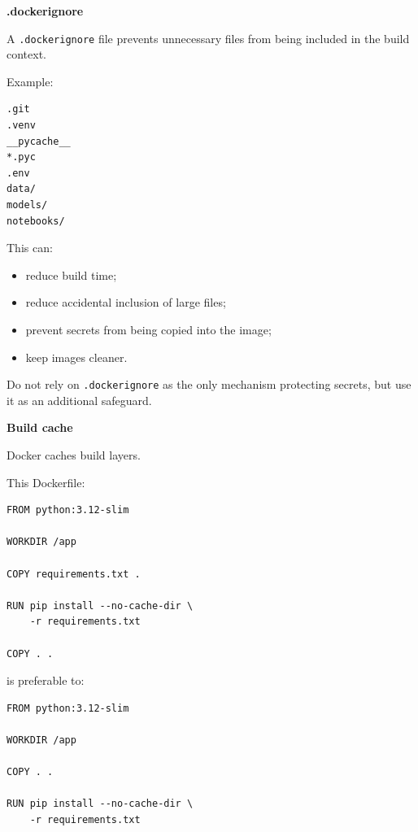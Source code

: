\documentclass[11pt,letterpaper]{article}
\begin{document}

\textbf{.dockerignore}

A \texttt{.dockerignore} file prevents unnecessary files from being included
in the build context.

Example:

\begin{lstlisting}
.git
.venv
__pycache__
*.pyc
.env
data/
models/
notebooks/
\end{lstlisting}

This can:

\begin{itemize}[leftmargin=*]
    \item reduce build time;
    \item reduce accidental inclusion of large files;
    \item prevent secrets from being copied into the image;
    \item keep images cleaner.
\end{itemize}

Do not rely on \texttt{.dockerignore} as the only mechanism protecting
secrets, but use it as an additional safeguard.



\textbf{Build cache}

Docker caches build layers.

This Dockerfile:

\begin{lstlisting}
FROM python:3.12-slim

WORKDIR /app

COPY requirements.txt .

RUN pip install --no-cache-dir \
    -r requirements.txt

COPY . .
\end{lstlisting}

is preferable to:

\begin{lstlisting}
FROM python:3.12-slim

WORKDIR /app

COPY . .

RUN pip install --no-cache-dir \
    -r requirements.txt
\end{lstlisting}
\end{document}
